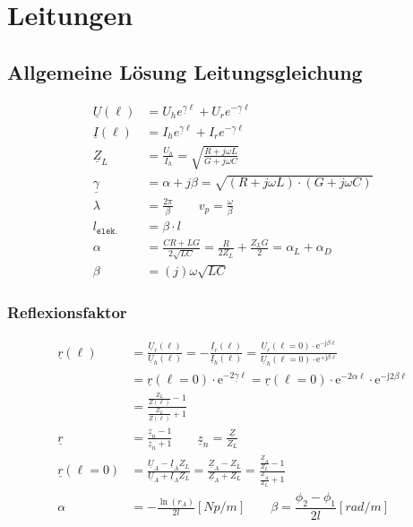 \section{Leitungen}
\subsection{Allgemeine Lösung Leitungsgleichung}
\begin{align*}
    \underline{U}(\ell)  & = U_h e^{\underline{\gamma} \ell} + U_r e^{-\underline{\gamma} \ell} \\
    \underline{I}(\ell)  & = I_h e^{\underline{\gamma} \ell} + I_r e^{-\underline{\gamma} \ell} \\
    \underline{Z}_L     & = \frac{U_h}{I_h} = \sqrt{ \frac{R + j \omega L}{G + j \omega C}}                                                                                   \\
    \underline{\gamma}  & = \alpha + j\beta = \sqrt{(R+j\omega L)\cdot(G+j\omega C)}                                                                                                            \\
    \lambda             & = \frac{2 \pi}{\beta} \qquad v_p = \frac{\omega}{\beta} \\
    l_\texttt{elek.}    & = \beta \cdot l                                                                                                                                     \\
    \alpha              & = \frac{C R+L G}{2 \sqrt{L C}}=\frac{R}{2 Z_L}+\frac{Z_L G}{2}=\alpha_L+\alpha_D \\
    \beta               & = (j) \omega \sqrt{L C}
\end{align*}
\subsubsection{Reflexionsfaktor}
\begin{align*}
    \underline{r}(\ell)     & = \frac{\underline{U}_r(\ell)}{\underline{U}_h(\ell)} = -\frac{\underline{I}_r(\ell)}{\underline{I}_h(\ell)} = \frac{\underline{U}_r(\ell=0) \cdot \mathrm{e}^{-\mathrm{j} \beta \ell}}{\underline{U}_h(\ell=0) \cdot \mathrm{e}^{+\mathrm{j} \beta \ell}} \\
                            & = \underline{r}(\ell=0) \cdot \mathrm{e}^{-2 \underline{\gamma} \ell}=\underline{r}(\ell=0) \cdot \mathrm{e}^{-2 \alpha \ell} \cdot \mathrm{e}^{-\mathrm{j} 2 \beta \ell}\\
                            & = \frac{\frac{Z_L}{\underline{Z}(\ell)}-1}{\frac{Z_L}{\underline{Z}(\ell)}+1} \\
    \underline{r}           & = \frac{\underline{z}_n-1}{\underline{z}_n+1} \qquad \underline{z}_n=\frac{\underline{Z}}{Z_L}\\
    \underline{r}(\ell = 0) & = \frac{\underline{U}_A-\underline{I}_A Z_L}{\underline{U}_A + \underline{I}_A Z_L}=\frac{\underline{Z}_A-Z_L}{\underline{Z}_A+Z_L}=\frac{\frac{\underline{Z}_A}{Z_L}-1}{\frac{\underline{Z}_A}{Z_L}+1}\\
                    \alpha  & = -\frac{\ln(r_A)}{2l} [\si{Np/m}]  \qquad  \beta = \dfrac{\phi_2 -\phi_1}{2l} [\si{rad/m}]
\end{align*}

